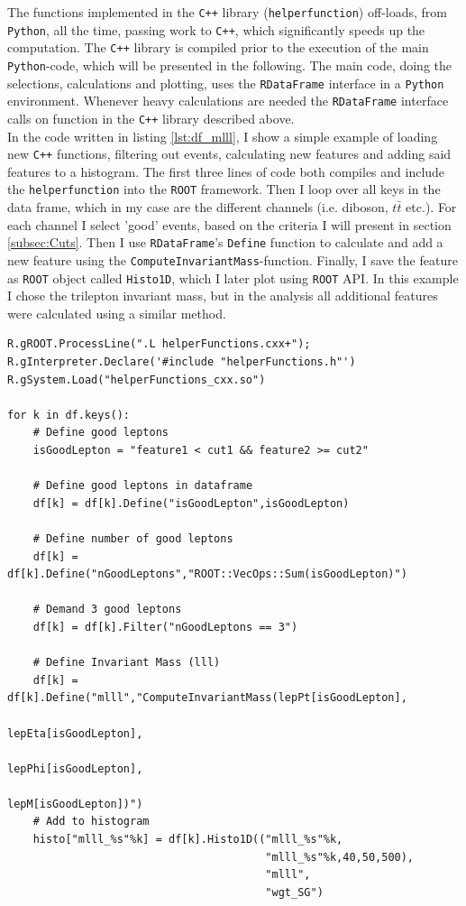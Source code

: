 The functions implemented in the \verb!C++! library (\texttt{helperfunction}) off-loads, from \verb!Python!, all the time, passing work to \verb!C++!,
which significantly speeds up the computation. The \verb!C++! library is compiled prior to the execution of the main \verb!Python!-code, which 
will be presented in the following. The main code, doing the selections, calculations and plotting, uses the \verb!RDataFrame! interface in a \verb!Python! 
environment. Whenever heavy calculations are needed the \verb!RDataFrame! interface calls on function in the \verb!C++! library described above. 
\\
In the code written in listing \ref{lst:df_mlll}, I show a simple example 
of loading new \verb!C++! functions, filtering out events, calculating new features and adding said 
features to a histogram. The first three lines of code both compiles and include the \texttt{helperfunction} 
into the \verb!ROOT! framework. Then I loop over all keys in the data frame, which in my case
are the different channels (i.e. diboson, $t\bar{t}$ etc.). For each channel I select 'good' events,
based on the criteria I will present in section \ref{subsec:Cuts}. Then I use \verb!RDataFrame!'s \texttt{Define} function to calculate
and add a new feature using the \texttt{ComputeInvariantMass}-function. Finally, I save the feature as \verb!ROOT! object called 
\texttt{Histo1D}, which I later plot using \verb!ROOT! \ac{API}. In this example I chose the trilepton invariant mass, 
but in the analysis all additional features were calculated using a similar method. 
\lstset{style=Python}
\begin{lstlisting}[caption={Python-file for calling dataframe and calculating the trilepton invariant mass.},captionpos=b, label={lst:df_mlll}]
R.gROOT.ProcessLine(".L helperFunctions.cxx+");
R.gInterpreter.Declare('#include "helperFunctions.h"') 
R.gSystem.Load("helperFunctions_cxx.so")

for k in df.keys():
    # Define good leptons
    isGoodLepton = "feature1 < cut1 && feature2 >= cut2"

    # Define good leptons in dataframe
    df[k] = df[k].Define("isGoodLepton",isGoodLepton)

    # Define number of good leptons
    df[k] = df[k].Define("nGoodLeptons","ROOT::VecOps::Sum(isGoodLepton)")

    # Demand 3 good leptons 
    df[k] = df[k].Filter("nGoodLeptons == 3")

    # Define Invariant Mass (lll)
    df[k] = df[k].Define("mlll","ComputeInvariantMass(lepPt[isGoodLepton], 
                                                      lepEta[isGoodLepton], 
                                                      lepPhi[isGoodLepton], 
                                                      lepM[isGoodLepton])")
    # Add to histogram
    histo["mlll_%s"%k] = df[k].Histo1D(("mlll_%s"%k,
                                        "mlll_%s"%k,40,50,500),
                                        "mlll",
                                        "wgt_SG")     
\end{lstlisting}



